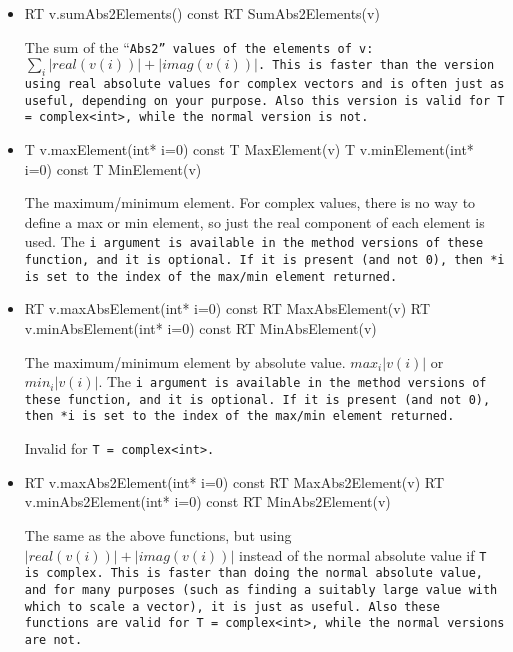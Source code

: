 \begin{itemize}
\item
\begin{tmvcode}
RT v.sumAbs2Elements() const
RT SumAbs2Elements(v)
\end{tmvcode}
The sum of the ``\tt{Abs2}'' values of the elements of \tt{v}: $\sum_i |real(v(i))| + |imag(v(i))|$.
This is faster than the version using real absolute values for
complex vectors and is often just as useful, depending on your purpose.  Also this version
is valid for \tt{T = complex<int>}, while the normal version is not.

\item
\begin{tmvcode}
T v.maxElement(int* i=0) const
T MaxElement(v)
T v.minElement(int* i=0) const
T MinElement(v)
\end{tmvcode}
The maximum/minimum element.  For complex values, there is no way to define a 
max or min element, so just the real component of each element is used.
The \tt{i} argument is available in the method versions of these function, and it is optional.
If it is present (and not 0), then \tt{*i} is set to the 
index of the max/min element returned.

\item
\begin{tmvcode}
RT v.maxAbsElement(int* i=0) const
RT MaxAbsElement(v)
RT v.minAbsElement(int* i=0) const
RT MinAbsElement(v)
\end{tmvcode}
The maximum/minimum element by absolute value.  $max_i |v(i)|$ or $min_i |v(i)|$.
The \tt{i} argument is available in the method versions of these function, and it is optional.
If it is present (and not 0), then \tt{*i} is set to the 
index of the max/min element returned.  

Invalid for \tt{T = complex<int>}.

\item
\begin{tmvcode}
RT v.maxAbs2Element(int* i=0) const
RT MaxAbs2Element(v)
RT v.minAbs2Element(int* i=0) const
RT MinAbs2Element(v)
\end{tmvcode}
The same as the above functions, but using
$|real(v(i))| + |imag(v(i))|$ instead of the normal absolute value if \tt{T} is complex.  
This is faster than doing
the normal absolute value, and for many purposes (such as finding a suitably large value
with which to scale a vector), it is just as useful.  Also these functions are
valid for \tt{T = complex<int>}, while the normal versions are not.

\end{itemize}


